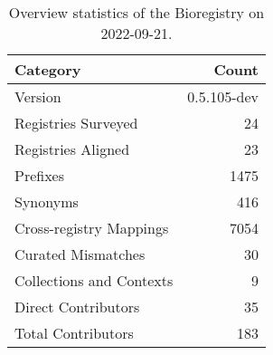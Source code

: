 \begin{table}
\centering
\caption{Overview statistics of the Bioregistry on 2022-09-21.}
\label{tab:bioregistry-summary}
\begin{tabular}{lr}
\toprule
                Category &       Count \\
\midrule
                 Version & 0.5.105-dev \\
     Registries Surveyed &          24 \\
      Registries Aligned &          23 \\
                Prefixes &        1475 \\
                Synonyms &         416 \\
 Cross-registry Mappings &        7054 \\
      Curated Mismatches &          30 \\
Collections and Contexts &           9 \\
     Direct Contributors &          35 \\
      Total Contributors &         183 \\
\bottomrule
\end{tabular}
\end{table}
